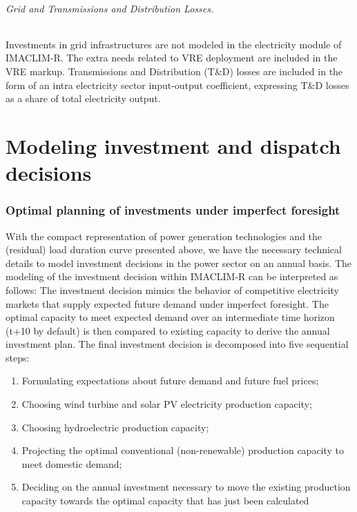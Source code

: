 \paragraph*{Grid and Transmissions and Distribution Losses.}

Investments in grid infrastructures are not modeled in the electricity module of IMACLIM-R. The extra needs related to VRE deployment are included in the VRE markup. Transmissions and Distribution (T\&D) losses are included in the form of an intra electricity sector input-output coefficient, expressing T\&D losses as a share of total electricity output.
\part*{Modeling investment and dispatch decisions}

\section{Optimal planning of investments under imperfect foresight}

With the compact representation of power generation technologies and the (residual) load duration curve presented above, we have the necessary technical details to model investment decisions in the power sector on an annual basis.
The modeling of the investment decision within IMACLIM-R can be interpreted as follows: The investment decision mimics the behavior of competitive electricity markets that supply expected future demand under imperfect foresight. The optimal capacity to meet expected demand over an intermediate time horizon (t+10 by default) is then compared to existing capacity to derive the annual investment plan.
The final investment decision is decomposed into five sequential steps:
\begin{enumerate}
    \item Formulating expectations about future demand and future fuel prices;
    \item Choosing  wind turbine and solar PV  electricity production capacity;
    \item Choosing hydroelectric production capacity;
    \item Projecting the optimal conventional (non-renewable) production capacity to meet domestic demand;
    \item Deciding on the annual investment necessary to move the existing production capacity towards the optimal capacity that has just been calculated
\end{enumerate}

